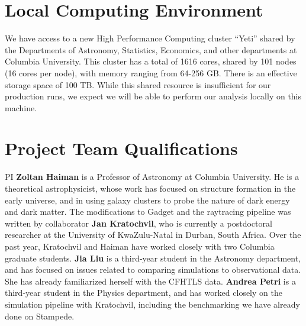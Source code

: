 \documentclass[10pt, preprint]{aastex}
\begin{document}
\section{Local Computing Environment}\label{Local Computing}

We have access to a new High Performance Computing cluster ``Yeti''
shared by the Departments of Astronomy, Statistics, Economics, and
other departments at Columbia University.  This cluster has a total of
1616 cores, shared by 101 nodes (16 cores per node), with memory
ranging from 64-256 GB.  There is an effective storage space of 100
TB.  While this shared resource is insufficient for our production
runs, we expect we will be able to perform our analysis locally on
this machine.

\section{Project Team Qualifications}

PI {\bf Zoltan Haiman} is a Professor of Astronomy at Columbia
University.  He is a theoretical astrophysicist, whose work has
focused on structure formation in the early universe, and in using
galaxy clusters to probe the nature of dark energy and dark matter.
The modifications to Gadget and the raytracing pipeline was written by
collaborator {\bf Jan Kratochvil}, who is currently a postdoctoral
researcher at the University of KwaZulu-Natal in Durban, South Africa.
Over the past year, Kratochvil and Haiman have worked closely with two
Columbia graduate students.  {\bf Jia Liu} is a third-year student in
the Astronomy department, and has focused on issues related to
comparing simulations to observational data. She has already
familiarized herself with the CFHTLS data.  {\bf Andrea Petri} is a
third-year student in the Physics department, and has worked closely
on the simulation pipeline with Kratochvil, including the benchmarking
we have already done on Stampede.





\end{document}
